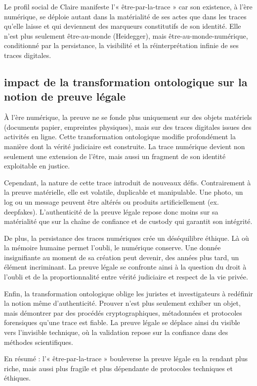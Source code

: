 \documentclass[12pt,a4paper]{article}
\begin{document}
	      Le profil social de Claire manifeste l’« être-par-la-trace » car son existence, à l’ère numérique, se déploie autant dans la matérialité de ses actes que dans les traces qu’elle laisse et qui deviennent des marqueurs constitutifs de son identité. Elle n’est plus seulement être-au-monde (Heidegger), mais être-au-monde-numérique, conditionné par la persistance, la visibilité et la réinterprétation infinie de ses traces digitales.
	     
	\subsection{ impact de la transformation ontologique sur la notion de preuve légale}
		
		À l’ère numérique, la preuve ne se fonde plus uniquement sur des objets matériels (documents papier, empreintes physiques), mais sur des traces digitales issues des activités en ligne. Cette transformation ontologique modifie profondément la manière dont la vérité judiciaire est construite. La trace numérique devient non seulement une extension de l’être, mais aussi un fragment de son identité exploitable en justice.
		
		Cependant, la nature de cette trace introduit de nouveaux défis. Contrairement à la preuve matérielle, elle est volatile, duplicable et manipulable. Une photo, un log ou un message peuvent être altérés ou produits artificiellement (ex. deepfakes). L’authenticité de la preuve légale repose donc moins sur sa matérialité que sur la chaîne de confiance et de custody qui garantit son intégrité.
		
		De plus, la persistance des traces numériques crée un déséquilibre éthique. Là où la mémoire humaine permet l’oubli, le numérique conserve. Une donnée insignifiante au moment de sa création peut devenir, des années plus tard, un élément incriminant. La preuve légale se confronte ainsi à la question du droit à l’oubli et de la proportionnalité entre vérité judiciaire et respect de la vie privée.
		
		Enfin, la transformation ontologique oblige les juristes et investigateurs à redéfinir la notion même d’authenticité. Prouver n’est plus seulement exhiber un objet, mais démontrer par des procédés cryptographiques, métadonnées et protocoles forensiques qu’une trace est fiable. La preuve légale se déplace ainsi du visible vers l’invisible technique, où la validation repose sur la confiance dans des méthodes scientifiques.
		
		En résumé : l’« être-par-la-trace » bouleverse la preuve légale en la rendant plus riche, mais aussi plus fragile et plus dépendante de protocoles techniques et éthiques.	
	
\end{document}
